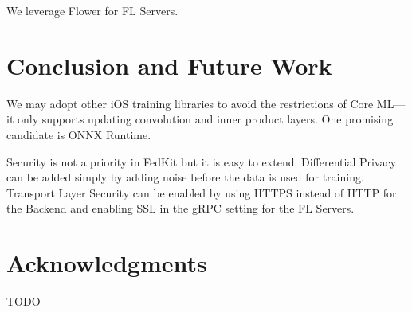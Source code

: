 \documentclass[letterpaper]{article} %
\begin{document}
We leverage Flower \cite{beutel2020flower} for FL Servers.

\section{Conclusion and Future Work}


We may adopt other iOS training libraries to avoid the restrictions of Core
ML---it only supports updating convolution and inner product layers.
One promising candidate is ONNX Runtime.

Security is not a priority in FedKit but it is easy to extend.
Differential Privacy can be added simply by adding noise before the data is
used for training.
Transport Layer Security can be enabled by
using HTTPS instead of HTTP for the Backend and
enabling SSL in the gRPC setting for the FL Servers.

\appendix

\section*{Acknowledgments}
TODO

\bigskip


\end{document}
